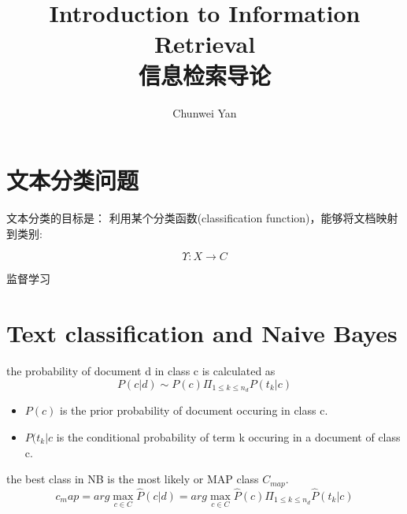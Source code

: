 \documentclass[a4paper]{ctexart}
\author{Chunwei Yan}
\title{Introduction to Information Retrieval\\信息检索导论}
\begin{document}
    \maketitle

    \section{文本分类问题}
    \par 文本分类的目标是： 利用某个分类函数(classification function)，能够将文档映射到类别:

    \begin{equation}
        \Upsilon :X\rightarrow C
    \end{equation}
    \par 监督学习

    \section{Text classification and Naive Bayes}
    \par the probability of document d in class c is calculated as
    \begin{equation}
        P(c|d) \sim P(c) \Pi_{1\le k \le n_{d}}{P(t_{k}|c)}
    \end{equation}
    \begin{itemize}
        \item $P(c)$ is the prior probability of document occuring in class c.
        \item ${P(t_{k}|c}$ is the conditional probability of term k occuring in a document of class c.
    \end{itemize}
    \par the best class in NB is the most likely or MAP class $C_{map}$.
    \begin{equation}
        c_map = arg\max_{c \in C}\hat{P}(c|d) = arg \max_{c \in C} \hat{P}(c)\Pi_{1 \le k \le n_{d}} \hat{P}(t_{k} | c)
    \end{equation}



    
    
    
    
    
    
\end{document}
